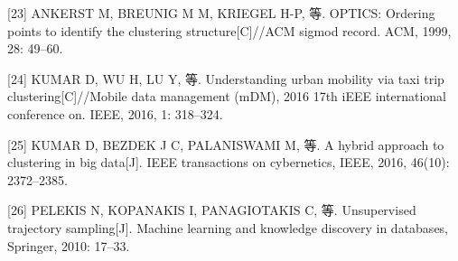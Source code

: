 \documentclass[]{article}
\begin{document}
\hypertarget{ref-ankerst1999optics}{}
{[}23{]} ANKERST M, BREUNIG M M, KRIEGEL H-P, 等. OPTICS: Ordering
points to identify the clustering structure{[}C{]}//ACM sigmod record.
ACM, 1999, 28: 49--60.

\hypertarget{ref-kumar2016understanding}{}
{[}24{]} KUMAR D, WU H, LU Y, 等. Understanding urban mobility via taxi
trip clustering{[}C{]}//Mobile data management (mDM), 2016 17th iEEE
international conference on. IEEE, 2016, 1: 318--324.

\hypertarget{ref-kumar2016hybrid}{}
{[}25{]} KUMAR D, BEZDEK J C, PALANISWAMI M, 等. A hybrid approach to
clustering in big data{[}J{]}. IEEE transactions on cybernetics, IEEE,
2016, 46(10): 2372--2385.

\hypertarget{ref-pelekis2010unsupervised}{}
{[}26{]} PELEKIS N, KOPANAKIS I, PANAGIOTAKIS C, 等. Unsupervised
trajectory sampling{[}J{]}. Machine learning and knowledge discovery in
databases, Springer, 2010: 17--33.
\end{document}
